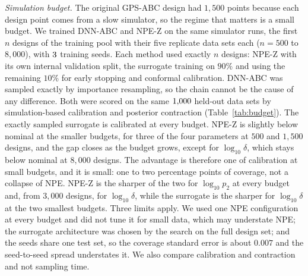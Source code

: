 \documentclass[sn-basic,iicol,pdflatex]{sn-jnl}
\begin{document}
\emph{Simulation budget.} The original GPS-ABC design had $1{,}500$ points because each design point comes from a slow simulator, so the regime that matters is a small budget. We trained DNN-ABC and NPE-Z on the same simulator runs, the first $n$ designs of the training pool with their five replicate data sets each ($n=500$ to $8{,}000$), with $\pbudgetSeeds$ training seeds. Each method used exactly $n$ designs: NPE-Z with its own internal validation split, the surrogate training on $90\%$ and using the remaining $10\%$ for early stopping and conformal calibration. DNN-ABC was sampled exactly by importance resampling, so the chain cannot be the cause of any difference. Both were scored on the same $\pbudgetK$ held-out data sets by simulation-based calibration and posterior contraction (Table~\ref{tab:budget}). The exactly sampled surrogate is calibrated at every budget. NPE-Z is slightly below nominal at the smaller budgets, for three of the four parameters at $500$ and $1{,}500$ designs, and the gap closes as the budget grows, except for $\log_{10}\delta$, which stays below nominal at $8{,}000$ designs. The advantage is therefore one of calibration at small budgets, and it is small: one to two percentage points of coverage, not a collapse of NPE. NPE-Z is the sharper of the two for $\log_{10}p_2$ at every budget and, from $3{,}000$ designs, for $\log_{10}\delta$, while the surrogate is the sharper for $\log_{10}\delta$ at the two smallest budgets. Three limits apply. We used one NPE configuration at every budget and did not tune it for small data, which may understate NPE; the surrogate architecture was chosen by the search on the full design set; and the seeds share one test set, so the coverage standard error is about $0.007$ and the seed-to-seed spread understates it. We also compare calibration and contraction and not sampling time.

\begin{table}[t]
\centering
\caption{Simulation budget: DNN-ABC (exact importance resampling) against NPE-Z trained on the same simulator runs. Means over $\pbudgetSeeds$ training seeds, scored on $\pbudgetK$ held-out data sets; an asterisk marks a coverage more than two binomial standard errors from $0.95$; contraction is $1-\mathrm{E}[\mathrm{Var}_{\text{post}}]/\mathrm{Var}_{\text{prior}}$.}
\label{tab:budget}

\end{table}
\end{document}
